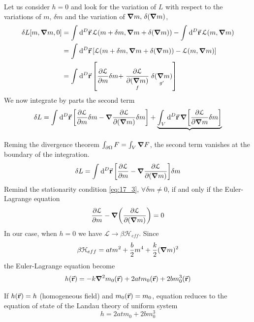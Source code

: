 \documentclass[../main/main.tex]{subfiles}
\begin{document}
Let us consider \( h=0 \) and look for the variation of \( L \) with respect to the variations of \( m,\, \delta m \)  and the variation of \( \grad m, \, \delta (\grad m) \),\begin{equation}
\begin{split}
\delta L [m, \grad m,0]  &=  \int_{}^{} \dd[D]{\va{r}} \mathcal{L} (m+\delta m, \grad m + \delta (\grad m)) - \int_{}^{} \dd[D]{\va{r}} \mathcal{L} (m,\grad m)    \\
& = \int_{}^{} \dd[D]{\va{r}} \qty[\mathcal{L} (m+\delta m, \grad m + \delta ( \grad m)) - \mathcal{L} (m, \grad m)] \\
& = \int_{}^{} \dd[D]{\va{r}} \qty[\pdv{\mathcal{L}}{m} \delta m + \underset{f}{\pdv{\mathcal{L}}{(\grad m)} } \underset{g'}{\delta (\grad m) }  ]
\end{split}
\end{equation}
We now integrate by parts the second term
\begin{equation}
\delta L = \int_{}^{} \dd[D]{\va{r}} \qty[\pdv{\mathcal{L}}{m} \delta m - \grad  \pdv{\mathcal{L}}{(\grad m)} \delta m ] + \underbrace{\int_{V}^{} \dd[D]{\va{r}} \grad \qty[\pdv{\mathcal{L}}{\grad m} \delta m ] }_{}
\end{equation}
Reming the divergence theorem \( \int_{\partial{ \Omega }}^{} F = \int_{V}^{} \grad F     \), the second term vanishes at the boundary of the integration.
\begin{equation}
  \delta L = \int_{}^{} \dd[D]{\va{r}} \qty[\pdv{\mathcal{L}}{m} - \grad \pdv{\mathcal{L}}{(\grad m)}  ] \delta m
\end{equation}
Remind the stationarity condition \eqref{eq:17_3}, \( \forall \delta m \neq 0 \), if and only if  the Euler-Lagrange equation
\begin{equation}
  \pdv{\mathcal{L}}{m} - \grad \qty(\pdv{\mathcal{L}}{(\grad m)} ) = 0
\end{equation}
In our case, when \( h=0 \) we have \( \mathcal{L} \rightarrow \beta \mathcal{H}_{eff} \). Since
\begin{equation}
  \beta \mathcal{H}_{eff} = a t m^2 + \frac{b}{2} m^4 + \frac{k}{2} (\grad m)^2
\end{equation}
the Euler-Lagrange equation become
\begin{equation}
  h (\va{r}) = - k \grad ^2 m_0 (\va{r}) + 2 a t m _0 (\va{r}) + 2 b m_0^3 (\va{r})
   \label{eq:17_4}
\end{equation}
\begin{remark}
If \( h (\va{r}) = h \) (homogeneous field) and \( m_0 (\va{r})=m_0 \), equation reduces to the equation of state of the Landau theory of uniform system
\begin{equation}
  h = 2 a t m_0 + 2 b m_0 ^3
\end{equation}
 \end{remark}
\end{document}
